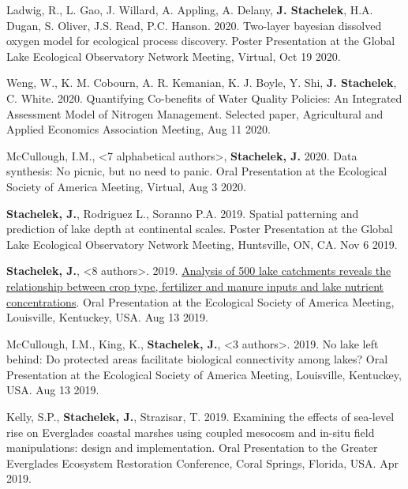 \documentclass[11pt]{article}
\makeatletter
\newlength{\bibhang}
\newlength{\bibsep}
 {\@listi \global\bibsep\itemsep \global\advance\bibsep by\parsep}
\newenvironment{bibenum*}
  {\renewcommand\labelenumi{[\theenumi]}%
   \etaremune[
     topsep=0pt,
     itemsep=\bibsep,
     parsep=0pt,partopsep=0pt,
     itemindent=-\bibhang,
     leftmargin={\bibhang+\widthof{[999]}}]}
  {\endetaremune}
\makeatother
\begin{document}
\begin{bibenum*}

\item Ladwig, R., L. Gao, J. Willard, A. Appling, A. Delany, \textbf{J. Stachelek}, H.A. Dugan, S. Oliver, J.S. Read, P.C. Hanson. 2020. Two-layer bayesian dissolved oxygen model for ecological process discovery. Poster Presentation at the Global Lake Ecological Observatory Network Meeting, Virtual, Oct 19 2020.

\item Weng, W., K. M. Cobourn, A. R. Kemanian, K. J. Boyle, Y. Shi, \textbf{J. Stachelek}, C. White. 2020. Quantifying Co-benefits of Water Quality Policies:  An Integrated Assessment Model of Nitrogen Management. Selected paper, Agricultural and Applied Economics Association Meeting, Aug 11 2020.

\item McCullough, I.M., <7 alphabetical authors>, \textbf{Stachelek, J.} 2020. Data synthesis: No picnic, but no need to panic. Oral Presentation at the Ecological Society of America Meeting, Virtual, Aug 3 2020.

\item \textbf{Stachelek, J.}, Rodriguez L., Soranno P.A. 2019. Spatial patterning and prediction of lake depth at continental scales. Poster Presentation at the Global Lake Ecological Observatory Network Meeting, Huntsville, ON, CA. Nov 6 2019.

\item \textbf{Stachelek, J.}, <8 authors>. 2019. \href{https://doi.org/10.6084/m9.figshare.12486164.v2}{Analysis of 500 lake catchments reveals the relationship between crop type, fertilizer and manure inputs and lake nutrient concentrations}. Oral Presentation at the Ecological Society of America Meeting, Louisville, Kentuckey, USA. Aug 13 2019.

\item McCullough, I.M., King, K., \textbf{Stachelek, J.}, <3 authors>. 2019. No lake left behind: Do protected areas facilitate biological connectivity among lakes? Oral Presentation at the Ecological Society of America Meeting, Louisville, Kentuckey, USA. Aug 13 2019.

\item Kelly, S.P., \textbf{Stachelek, J.}, Strazisar, T. 2019. Examining the effects of sea-level rise on Everglades coastal marshes using coupled mesocosm and in-situ field manipulations: design and implementation. Oral Presentation to the Greater Everglades Ecosystem Restoration Conference, Coral Springs, Florida, USA. Apr 2019.


\end{bibenum*}
\end{document}
